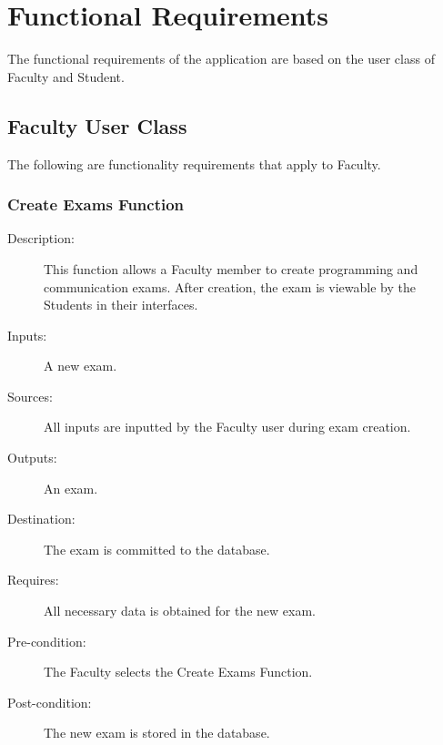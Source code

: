 %
%



\section{Functional Requirements}
The functional requirements of the application are based on the user class of
Faculty and Student.
\subsection{Faculty User Class}
The following are functionality requirements that apply to Faculty.
\subsubsection{\large Create Exams Function} 
\begin{boxed} %
\begin{description}
\item[Description:]
   This function allows a Faculty member to create programming and communication
   exams. After creation, the exam is viewable by the Students in their
   interfaces.
\item[Inputs:]
   A new exam.
\item[Sources:]
   All inputs are inputted by the Faculty user during exam creation.
\item[Outputs:]
   An exam.
\item[Destination:]
   The exam is committed to the database.
\item[Requires:]
   All necessary data is obtained for the new exam.
\item[Pre-condition:]
   The Faculty selects the Create Exams Function.
\item[Post-condition:]
   The new exam is stored in the database.
\end{description}
\end{boxed} %

